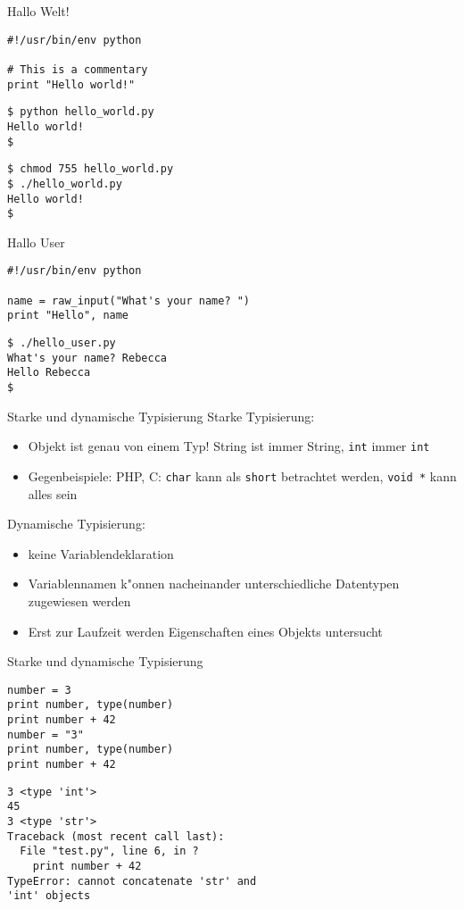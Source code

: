 \begin{frame}[fragile]{Hallo Welt!}
\begin{lstlisting}[style=Python]
#!/usr/bin/env python

# This is a commentary
print "Hello world!"
\end{lstlisting}
\begin{lstlisting}[style=Shell]
$ python hello_world.py
Hello world!
$
\end{lstlisting}%
\begin{lstlisting}[style=Shell]
$ chmod 755 hello_world.py
$ ./hello_world.py
Hello world!
$
\end{lstlisting} %
\end{frame}

\begin{frame}[fragile]{Hallo User}
\begin{lstlisting}[style=Python]
#!/usr/bin/env python

name = raw_input("What's your name? ")
print "Hello", name
\end{lstlisting}
\begin{lstlisting}[style=Shell]
$ ./hello_user.py
What's your name? Rebecca
Hello Rebecca
$
\end{lstlisting}
\end{frame}

\begin{frame}{Starke und dynamische Typisierung}
\alert{Starke Typisierung:}
\begin{itemize}
\item Objekt ist genau von einem Typ! String ist immer String, \texttt{int} immer \texttt{int}
\item Gegenbeispiele: PHP, C: \texttt{char} kann als \texttt{short} betrachtet werden, \texttt{void~*} kann alles sein
\end{itemize}
\alert{Dynamische Typisierung: }
\begin{itemize}
\item keine Variablendeklaration
\item Variablennamen k"onnen nacheinander unterschiedliche Datentypen zugewiesen werden
\item Erst zur Laufzeit werden Eigenschaften eines Objekts untersucht
\end{itemize}
\end{frame}

\begin{frame}[fragile]{Starke und dynamische Typisierung}
\begin{lstlisting}[style=Python]
number = 3
print number, type(number)
print number + 42
number = "3"
print number, type(number)
print number + 42
\end{lstlisting}
\begin{lstlisting}[style=Shell]
3 <type 'int'>
45
3 <type 'str'>
Traceback (most recent call last):
  File "test.py", line 6, in ?
    print number + 42
TypeError: cannot concatenate 'str' and 
'int' objects
\end{lstlisting}
\end{frame}

